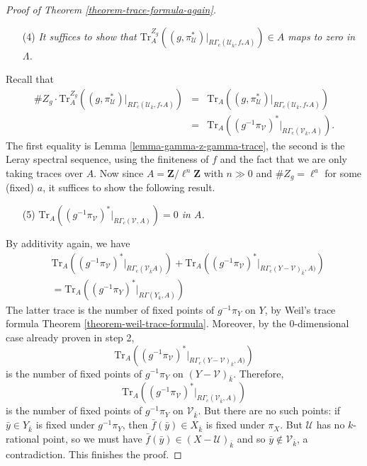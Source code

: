 \begin{proof}[Proof of Theorem \ref{theorem-trace-formula-again}]
\begin{enumerate}
\item[(4)]
{\it
It suffices to show that $\text{Tr}_A^{Z_g}\left((g,
\pi_\mathcal{U}^*)\big|_{R\Gamma_c(\mathcal{U}_{\bar k}, f_*A)}\right) \in A$
maps to zero in $\Lambda$.
}
\end{enumerate}
Recall that
\begin{eqnarray*}
\# Z_g \cdot \text{Tr}_A^{Z_g}\left((g,
\pi_\mathcal{U}^*)\big|_{R\Gamma_c(\mathcal{U}_{\bar k}, f_*A)}\right)
& = & \text{Tr}_A\left((g, \pi_\mathcal{U}^*)\big|_{R\Gamma_c(\mathcal{U}_{\bar
k}, f_*A)}\right)\\
& = &
\text{Tr}_A\left((g^{-1}\pi_\mathcal{V})^*\big|_{R\Gamma_c(\mathcal{V}_{\bar
k}, A)}\right).
\end{eqnarray*}
The first equality is
Lemma \ref{lemma-gamma-z-gamma-trace},
the second is the Leray
spectral sequence, using the finiteness of $f$ and the fact that we are only
taking traces over $A$. Now since $A=\mathbf{Z}/\ell^n\mathbf{Z}$ with
$n \gg 0$ and $\# Z_g = \ell^a$ for some (fixed) $a$,
it suffices to show the following result.
\begin{enumerate}
\item[(5)]
{\it $\text{Tr}_A\left((g^{-1}\pi_\mathcal{V})^*\big|_{R\Gamma_c(\mathcal{V},
A)}\right) = 0$ in $A$.}
\end{enumerate}
By additivity again, we have
\begin{eqnarray*}
&
\text{Tr}_A
\left(
(g^{-1}\pi_\mathcal{V})^*\big|_{R\Gamma_c(\mathcal{V}_{\bar k} A)}
\right)
+
\text{Tr}_A
\left(
(g^{-1}\pi_\mathcal{V})^*\big|_{R\Gamma_c(Y-\mathcal {V})_{\bar k}, A)}
\right) \\
&
=
\text{Tr}_A
\left(
(g^{-1}\pi_Y)^*\big|_{R\Gamma(Y_{\bar k}, A)}
\right)
\end{eqnarray*}
The latter trace is the number of fixed points of $g^{-1}\pi_Y$ on $Y$, by
Weil's trace formula
Theorem \ref{theorem-weil-trace-formula}.
Moreover, by the 0-dimensional case already proven in step 2,
$$
\text{Tr}_A\left((g^{-1}\pi_\mathcal{V})^*\big|_{R\Gamma_c(Y-\mathcal{V})_{\bar
k}, A)}\right)
$$
is the number of fixed points of $g^{-1}\pi_Y$ on $(Y-\mathcal{V})_{\bar k}$.
Therefore,
$$
\text{Tr}_A\left((g^{-1}\pi_\mathcal{V})^*\big|_{R\Gamma_c(\mathcal{V}_{\bar
k}, A)}\right)
$$
is the number of fixed points of $g^{-1}\pi_Y$ on $\mathcal{V}_{\bar k}$. But
there are no such points: if $\bar y\in Y_{\bar k}$ is fixed under
$g^{-1}\pi_Y$, then $\bar f(\bar y) \in X_{\bar k}$ is fixed under $\pi_X$. But
$\mathcal{U}$ has no $k$-rational point, so we must have $\bar f(\bar y)\in
(X-\mathcal{U})_{\bar k}$ and so $\bar y\notin \mathcal{V}_{\bar k}$, a
contradiction.
This finishes the proof.
\end{proof}

